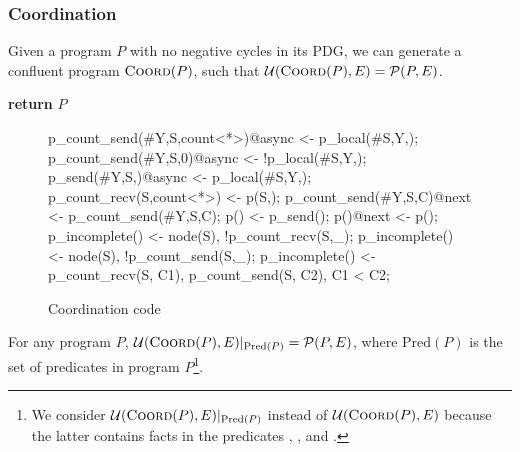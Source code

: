 \subsubsection{Coordination}
\label{sec:coord}
Given a \lang program $P$ with no negative cycles in its PDG, we can generate a confluent program $\textsc{Coord}(P)$, such that \linebreak $\mathcal{U}(\textsc{Coord}(P), E) = \mathcal{P}(P, E)$.


\begin{algorithmic}[1]
  \EndFor
   \label{alg:addrules} %
   \label{alg:lastfor}
  \EndFor
  \EndFor%
  \State \textbf{return} $P$
  \EndProcedure
\end{algorithmic}


\begin{figure}[h!]
\label{fig:coordcode}
\begin{Dedalus}
p_count_send(#Y,S,count<*>)@async <- p_local(#S,Y,);
p_count_send(#Y,S,0)@async <- !p_local(#S,Y,\dbar{_});
p_send(#Y,S,)@async <- p_local(#S,Y,);
p_count_recv(S,count<*>) <- p(S,);
p_count_send(#Y,S,C)@next <- p_count_send(#Y,S,C);
p() <- p_send();
p()@next <- p();
p_incomplete() <- node(S), !p_count_recv(S,_);
p_incomplete() <- node(S), !p_count_send(S,_);
p_incomplete() <- p_count_recv(S, C1),
                  p_count_send(S, C2), C1 < C2;
\end{Dedalus}
\caption{Coordination code}
\end{figure}

\begin{theorem}
For any program $P$, $\mathcal{U}(\textsc{Coord}(P), E)|_{\text{Pred}(P)} = \mathcal{P}(P, E)$, where $\text{Pred}(P)$ is the set of predicates in program $P$\footnote{We consider $\mathcal{U}(\textsc{Coord}(P), E)|_{\text{Pred}(P)}$ instead of $\mathcal{U}(\textsc{Coord}(P), E)$ because the latter contains facts in the predicates , , and .}.
\end{theorem}


